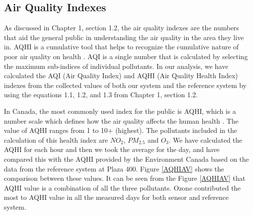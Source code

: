 \newpage


\subsection{Air Quality Indexes}


As discussed in Chapter 1, section 1.2, the air quality indexes are the numbers that aid the general public in understanding the air quality in the area they live in. AQHI is a cumulative tool that helps to recognize the cumulative nature of poor air quality on health \cite{hasselback2010air}.  AQI is a single number that is calculated by selecting the maximum sub-indices of individual pollutants. In our analysis, we have calculated the AQI (Air Quality Index) and AQHI (Air Quality Health Index) indexes from the collected values of both our system and the reference system by using the equations 1.1, 1.2, and 1.3 from Chapter 1, section 1.2.

In Canada, the most commonly used index for the public is AQHI, which is a number scale which defines how the air quality affects the human health \cite{AQHICAN}. The value of AQHI ranges from 1 to 10+ (highest). The pollutants included in the calculation of this health index are $NO_{2}$, $PM_{2.5}$ and $O_{3}$. We have calculated the AQHI for each hour and then we took the average for the day, and have compared this with the AQHI provided by the Environment Canada based on the data from the reference system at Plaza 400. Figure \ref{AQHIAV} shows the comparison between these values. It can be seen from the Figure \ref{AQHIAV} that AQHI value is a combination of all the three pollutants. Ozone contributed the most to AQHI value in all the measured days for both sensor and reference system.


